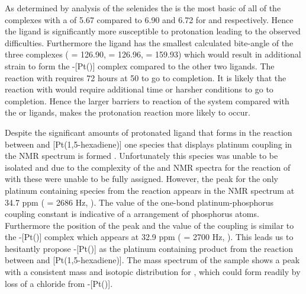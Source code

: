 As determined by analysis of the \tBuxantphos{} selenides the \tBusixantphos{} is the most basic of all of the complexes with a \pKb{} of 5.67 compared to 6.90 and 6.72 for \tButhixantphos{} and \tBuxantphos{} respectively.  Hence the \tBusixantphos{} ligand is significantly more susceptible to protonation leading to the observed difficulties.  Furthermore the \tBusixantphos{} ligand has the smallest calculated bite-angle of the three complexes (\tBusixantphos{} = 126.90\degrees, \tButhixantphos{} = 126.96\degrees, \tBuxantphos{} = 159.93\degrees) which would result in additional strain to form the \trans-[Pt(\tBusixantphos)] complex compared to the other two ligands.  The reaction with \tButhixantphos{} requires 72 hours at 50 \degC{} to go to completion.  It is likely that the reaction with \tBusixantphos{} would require additional time or harsher conditions to go to completion.  Hence the larger barriers to reaction of the \tBusixantphos{} system compared with the \tButhixantphos{} or \tBuxantphos{} ligands, makes the protonation reaction more likely to occur.  

Despite the significant amounts of protonated \tBusixantphos{} ligand that forms in the reaction between \tBusixantphos{} and [Pt(1,5-hexadiene)] one species that displays platinum coupling in the \phosphorus{} NMR spectrum is formed .  Unfortunately this species was unable to be isolated and due to the complexity of the \proton{} and \carbon{} NMR spectra for the reaction of \tBusixantphos{} with  these were unable to be fully assigned.  However, the peak for the only platinum containing species from the reaction appears in the \phosphorus{} NMR spectrum at 34.7 ppm (\JPtP{} = 2686 Hz, ).  The value of the one-bond platinum-phosphorus coupling constant is indicative of a \trans{} arrangement of phosphorus atoms.  Furthermore the position of the peak and the value of the coupling is similar to the \trans-[Pt(\tButhixantphos)] complex which appears at 32.9 ppm (\JPtP{} = 2700 Hz, ).  This leads us to hesitantly propose \trans-[Pt(\tBusixantphos)] as the platinum containing product from the reaction between \tBusixantphos{} and [Pt(1,5-hexadiene)].  The mass spectrum of the sample shows a peak with a consistent mass and isotopic distribution for , which could form readily by loss of a chloride from \trans-[Pt(\tBusixantphos)].

